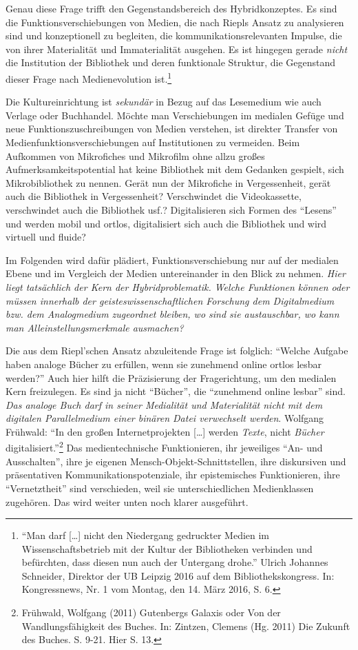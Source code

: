 \documentclass[a4paper,
fontsize=11pt,
oneside,
numbers=noperiodatend,
parskip=half-,
bibliography=totoc,
final
]{scrartcl}
\begin{document}
Genau diese Frage trifft den Gegenstandsbereich des Hybridkonzeptes. Es
sind die Funktionsverschiebungen von Medien, die nach Riepls Ansatz zu
analysieren sind und konzeptionell zu begleiten, die
kommunikationsrelevanten Impulse, die von ihrer Materialität und
Immaterialität ausgehen. Es ist hingegen gerade \emph{nicht} die
Institution der Bibliothek und deren funktionale Struktur, die
Gegenstand dieser Frage nach Medienevolution ist.\footnote{\enquote{Man
  darf {[}\ldots{}{]} nicht den Niedergang gedruckter Medien im
  Wissenschaftsbetrieb mit der Kultur der Bibliotheken verbinden und
  befürchten, dass diesen nun auch der Untergang drohe.} Ulrich Johannes
  Schneider, Direktor der UB Leipzig 2016 auf dem Bibliothekskongress.
  In: Kongressnews, Nr. 1 vom Montag, den 14. März 2016, S. 6.}

Die Kultureinrichtung ist \emph{sekundär} in Bezug auf das Lesemedium
wie auch Verlage oder Buchhandel. Möchte man Verschiebungen im medialen
Gefüge und neue Funktionszuschreibungen von Medien verstehen, ist
direkter Transfer von Medienfunktionsverschiebungen auf Institutionen zu
vermeiden. Beim Aufkommen von Mikrofiches und Mikrofilm ohne allzu
großes Aufmerksamkeitspotential hat keine Bibliothek mit dem Gedanken
gespielt, sich Mikrobibliothek zu nennen. Gerät nun der Mikrofiche in
Vergessenheit, gerät auch die Bibliothek in Vergessenheit? Verschwindet
die Videokassette, verschwindet auch die Bibliothek usf.? Digitalisieren
sich Formen des \enquote{Lesens} und werden mobil und ortlos,
digitalisiert sich auch die Bibliothek und wird virtuell und fluide?

Im Folgenden wird dafür plädiert, Funktionsverschiebung nur auf der
medialen Ebene und im Vergleich der Medien untereinander in den Blick zu
nehmen. \emph{Hier liegt tatsächlich der Kern der Hybridproblematik.
Welche Funktionen können oder müssen innerhalb der
geisteswissenschaftlichen Forschung dem Digitalmedium bzw. dem
Analogmedium zugeordnet bleiben, wo sind sie austauschbar, wo kann man
Alleinstellungsmerkmale ausmachen?}

Die aus dem Riepl'schen Ansatz abzuleitende Frage ist folglich:
\enquote{Welche Aufgabe haben analoge Bücher zu erfüllen, wenn sie
zunehmend online ortlos lesbar werden?} Auch hier hilft die Präzisierung
der Fragerichtung, um den medialen Kern freizulegen. Es sind ja nicht
\enquote{Bücher}, die \enquote{zunehmend online lesbar} sind. \emph{Das
analoge Buch darf in seiner Medialität und Materialität nicht mit dem
digitalen Parallelmedium einer binären Datei verwechselt werden}.
Wolfgang Frühwald: \enquote{In den großen Internetprojekten
{[}\ldots{}{]} werden \emph{Texte}, nicht \emph{Bücher}
digitalisiert.}\footnote{Frühwald, Wolfgang (2011) Gutenbergs Galaxis
  oder Von der Wandlungsfähigkeit des Buches. In: Zintzen, Clemens (Hg.
  2011) Die Zukunft des Buches. S. 9-21. Hier S. 13.} Das
medientechnische Funktionieren, ihr jeweiliges \enquote{An- und
Ausschalten}, ihre je eigenen Mensch-Objekt-Schnittstellen, ihre
diskursiven und präsentativen Kommunikationspotenziale, ihr
epistemisches Funktionieren, ihre \enquote{Vernetztheit} sind
verschieden, weil sie unterschiedlichen Medienklassen zugehören. Das
wird weiter unten noch klarer ausgeführt.
\end{document}
